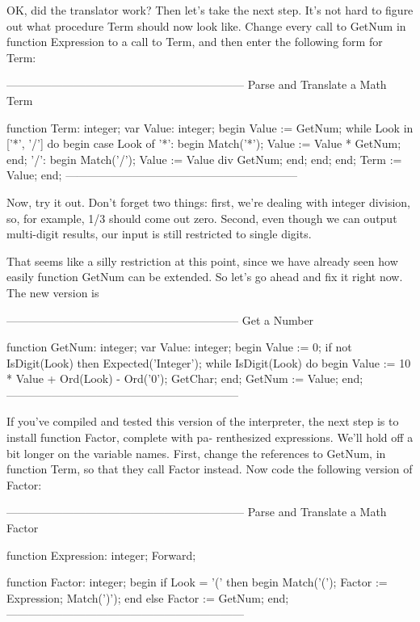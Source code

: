 \documentclass[float=false, crop=false]{standalone}
\begin{document}
OK, did the translator work? Then let's take the next step. It's not hard to
figure out what procedure Term should now look like. Change every call to GetNum
in function Expression to a call to Term, and then enter the following form for
Term:

\begin{code}
{---------------------------------------------------------------}
{ Parse and Translate a Math Term }

function Term: integer;
var Value: integer;
begin
   Value := GetNum;
   while Look in ['*', '/'] do begin
      case Look of
       '*': begin
               Match('*');
               Value := Value * GetNum;
            end;
       '/': begin
               Match('/');
               Value := Value div GetNum;
            end;
      end;
   end;
   Term := Value;
end;
{--------------------------------------------------------------}
\end{code}

Now, try it out. Don't forget two things: first, we're dealing with integer
division, so, for example, 1/3 should come out zero. Second, even though we can
output multi-digit results, our input is still restricted to single digits.

That seems like a silly restriction at this point, since we have already seen
how easily function GetNum can be extended. So let's go ahead and fix it right
now. The new version is

\begin{code}
{--------------------------------------------------------------}
{ Get a Number }

function GetNum: integer;
var Value: integer;
begin
   Value := 0;
   if not IsDigit(Look) then Expected('Integer');
   while IsDigit(Look) do begin
      Value := 10 * Value + Ord(Look) - Ord('0');
      GetChar;
   end;
   GetNum := Value;
end;
{--------------------------------------------------------------}
\end{code}


If you've compiled and tested this version of the interpreter, the next step is
to install function Factor, complete with pa- renthesized expressions. We'll
hold off a bit longer on the variable names. First, change the references to
GetNum, in function Term, so that they call Factor instead. Now code the
following version of Factor:

\begin{code}
{---------------------------------------------------------------}
{ Parse and Translate a Math Factor }

function Expression: integer; Forward;

function Factor: integer;
begin
   if Look = '(' then begin
      Match('(');
      Factor := Expression;
      Match(')');
      end
   else
       Factor := GetNum;
end;
{---------------------------------------------------------------}
\end{code}
\end{document}
